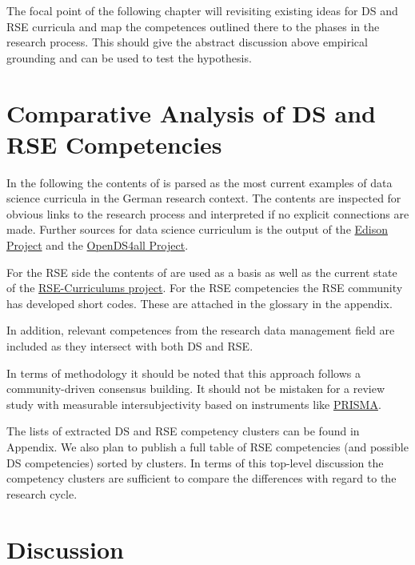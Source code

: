 \documentclass[
        english,biblatex
    ]{lni}
\begin{document}
    The focal point of the following chapter will revisiting existing
    ideas for DS and RSE curricula and map the competences outlined
    there to the phases in the research process. This should give the
    abstract discussion above empirical grounding and can be used to
    test the hypothesis.

    \section{Comparative Analysis of DS and RSE
    Competencies}\label{comparative-analysis-of-ds-and-rse-competencies}

    In the following the contents of \autocite{GI2021DataScience} is
    parsed as the most current examples of data science curricula in the
    German research context. The contents are inspected for obvious
    links to the research process and interpreted if no explicit
    connections are made. Further sources for data science curriculum is
    the output of the
    \href{https://edison-project.eu/edison/edison-data-science-framework-edsf}{Edison
    Project} and the
    \href{https://github.com/odpi/OpenDS4All}{OpenDS4all Project}.

    For the RSE side the contents of \autocite{Goth2024RSE} are used as
    a basis as well as the current state of the
    \href{https://github.com/juliandehne/RSE-Masters/blob/main/curriculum.md}{RSE-Curriculums
    project}. For the RSE competencies the RSE community has developed
    short codes. These are attached in the glossary in the appendix.

    In addition, relevant competences from the research data management
    field \autocite{petersen_2025_15025246} are included as they
    intersect with both DS and RSE.

    In terms of methodology it should be noted that this approach
    follows a community-driven consensus building. It should not be
    mistaken for a review study with measurable intersubjectivity based
    on instruments like \href{https://www.prisma-statement.org}{PRISMA}.

    The lists of extracted DS and RSE competency clusters can be found
    in Appendix. We also plan to publish a full table of RSE
    competencies (and possible DS competencies) sorted by clusters. In
    terms of this top-level discussion the competency clusters are
    sufficient to compare the differences with regard to the research
    cycle.

    \section{Discussion}\label{discussion}
\end{document}

